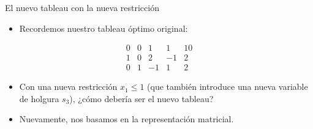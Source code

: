 \documentclass{beamer}
\begin{document}
\begin{frame}{El nuevo tableau con la nueva restricción}
    \begin{itemize}
        \item Recordemos nuestro tableau óptimo original:
    \end{itemize}

    \[
    \begin{array}{cccc|c}
        0 & 0 & 1 & 1 & 10 \\
        \hline
        1 & 0 & 2 & -1 & 2 \\
        0 & 1 & -1 & 1 & 2
    \end{array}
    \]

    \begin{itemize}
        \item Con una nueva restricción \(x_1 \leq 1\) (que también introduce una nueva variable de holgura \(s_3\)), ¿cómo debería ser el nuevo tableau?
        \item Nuevamente, nos basamos en la representación matricial.
    \end{itemize}
\end{frame}
\end{document}
